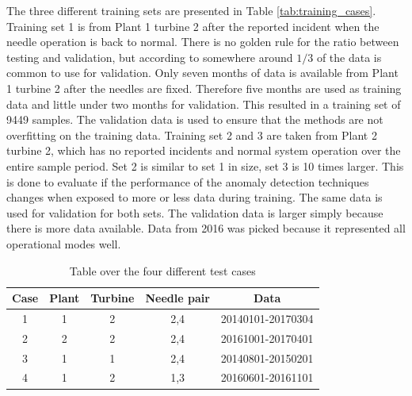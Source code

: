         The three different training sets are presented in Table \ref{tab:training_cases}. Training set 1 is from Plant 1 turbine 2 after the reported incident when the needle operation is back to normal. There is no golden rule for the ratio between testing and validation, but according to \cite{Kohavi1995} somewhere around $1/3$ of the data is common to use for validation. Only seven months of data is available from Plant 1 turbine 2 after the needles are fixed. Therefore five months are used as training data and little under two months for validation. This resulted in a training set of 9449 samples. The validation data is used to ensure that the methods are not overfitting on the training data. Training set 2 and 3 are taken from Plant 2 turbine 2, which has no reported incidents and normal system operation over the entire sample period. Set 2 is similar to set 1 in size, set 3 is 10 times larger. This is done to evaluate if the performance of the anomaly detection techniques changes when exposed to more or less data during training. The same data is used for validation for both sets. The validation data is larger simply because there is more data available. Data from 2016 was picked because it represented all operational modes well. 
        
        \begin{table}[]
            \centering
            \begin{tabular}{ccccc}
                \toprule
                \textbf{Case}    & \textbf{Plant} & \textbf{Turbine}   & \textbf{Needle pair}   & \textbf{Data}               \\ \midrule
                1       & 1     & 2         & 2,4           & 20140101-20170304     \\ 
                2       & 2     & 2         & 2,4           & 20161001-20170401     \\ 
                3       & 1     & 1         & 2,4           & 20140801-20150201     \\ 
                4       & 1     & 2         & 1,3           & 20160601-20161101     \\ \bottomrule
            \end{tabular}
            \caption{Table over the four different test cases}
            \label{tab:test_cases}
        \end{table}
        
